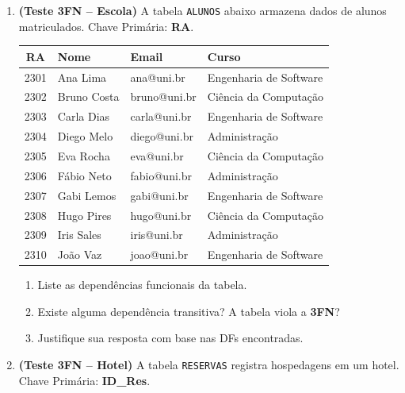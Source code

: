 \documentclass[12pt]{article}
\begin{document}
\begin{enumerate}[label=\textbf{Questão \arabic*:}, leftmargin=*]
  \vspace{0.4cm}

  \item \textbf{(Teste 3FN -- Escola)} A tabela \texttt{ALUNOS} abaixo armazena dados de alunos matriculados. Chave Primária: \textbf{RA}.

  \vspace{0.2cm}
  \centering
  \begin{tabular}{|c|l|l|l|}
    \hline
    \textbf{RA} & \textbf{Nome} & \textbf{Email} & \textbf{Curso} \\ \hline
    2301 & Ana Lima    & ana@uni.br    & Engenharia de Software \\ \hline
    2302 & Bruno Costa & bruno@uni.br  & Ciência da Computação  \\ \hline
    2303 & Carla Dias  & carla@uni.br  & Engenharia de Software \\ \hline
    2304 & Diego Melo  & diego@uni.br  & Administração          \\ \hline
    2305 & Eva Rocha   & eva@uni.br    & Ciência da Computação  \\ \hline
    2306 & Fábio Neto  & fabio@uni.br  & Administração          \\ \hline
    2307 & Gabi Lemos  & gabi@uni.br   & Engenharia de Software \\ \hline
    2308 & Hugo Pires  & hugo@uni.br   & Ciência da Computação  \\ \hline
    2309 & Iris Sales  & iris@uni.br   & Administração          \\ \hline
    2310 & João Vaz    & joao@uni.br   & Engenharia de Software \\ \hline
  \end{tabular}
  \flushleft
  \vspace{0.2cm}
  \begin{enumerate}[label=\alph*)]
    \item Liste as dependências funcionais da tabela.
    \item Existe alguma dependência transitiva? A tabela viola a \textbf{3FN}?
    \item Justifique sua resposta com base nas DFs encontradas.
  \end{enumerate}

  \vspace{0.4cm}

  \item \textbf{(Teste 3FN -- Hotel)} A tabela \texttt{RESERVAS} registra hospedagens em um hotel. Chave Primária: \textbf{ID\_Res}.


\end{enumerate}
\end{document}

